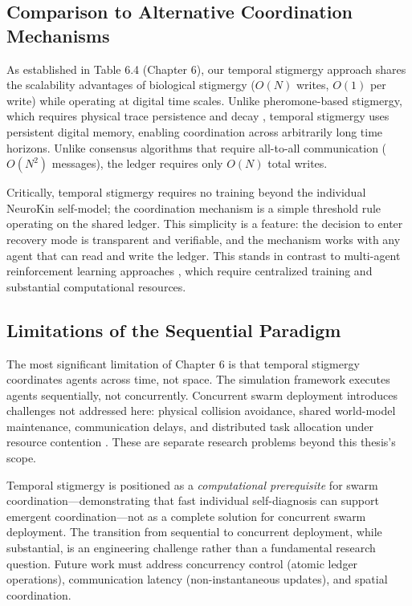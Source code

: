 \documentclass[12pt,a4paper,oneside]{report}
\begin{document}
\subsection{Comparison to Alternative Coordination Mechanisms}

As established in Table 6.4 (Chapter 6), our temporal stigmergy approach shares the scalability advantages of biological stigmergy ($O(N)$ writes, $O(1)$ per write) while operating at digital time scales. Unlike pheromone-based stigmergy, which requires physical trace persistence and decay \cite{bongard2006resilient}, temporal stigmergy uses persistent digital memory, enabling coordination across arbitrarily long time horizons. Unlike consensus algorithms that require all-to-all communication ($O(N^2)$ messages), the ledger requires only $O(N)$ total writes.

Critically, temporal stigmergy requires no training beyond the individual NeuroKin self-model; the coordination mechanism is a simple threshold rule operating on the shared ledger. This simplicity is a feature: the decision to enter recovery mode is transparent and verifiable, and the mechanism works with any agent that can read and write the ledger. This stands in contrast to multi-agent reinforcement learning approaches \cite{domberg2026selfadapting, daneshmand2026slowrl}, which require centralized training and substantial computational resources.

\subsection{Limitations of the Sequential Paradigm}

The most significant limitation of Chapter 6 is that temporal stigmergy coordinates agents across time, not space. The simulation framework executes agents sequentially, not concurrently. Concurrent swarm deployment introduces challenges not addressed here: physical collision avoidance, shared world-model maintenance, communication delays, and distributed task allocation under resource contention \cite{matsuki2024gaussian, keetha2024splattam}. These are separate research problems beyond this thesis's scope.

Temporal stigmergy is positioned as a \textit{computational prerequisite} for swarm coordination---demonstrating that fast individual self-diagnosis can support emergent coordination---not as a complete solution for concurrent swarm deployment. The transition from sequential to concurrent deployment, while substantial, is an engineering challenge rather than a fundamental research question. Future work must address concurrency control (atomic ledger operations), communication latency (non-instantaneous updates), and spatial coordination. 
\end{document}
